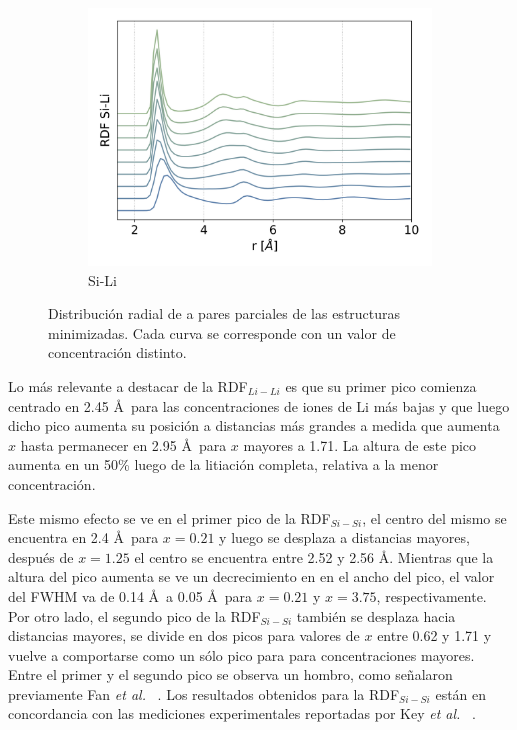 \begin{figure}[h!]
\begin{subfigure}{.475\textwidth}
        \centering
        \includegraphics[width=\textwidth]{Silicio/caracterizacion/resultados/rdf/rdf-SiLi.png}
        \caption{Si-Li}
        \label{fig:rdf-SiLi}
    \end{subfigure}
    \caption{Distribución radial de a pares parciales de las estructuras 
    minimizadas. Cada curva se corresponde con un valor de concentración
    distinto.}
    \label{fig:rdf}
\end{figure}

Lo más relevante a destacar de la RDF$_{Li-Li}$ es que su primer pico comienza 
centrado en 2.45 \AA\ para las concentraciones de iones de Li más bajas y que 
luego dicho pico aumenta su posición a distancias más grandes a medida que aumenta
$x$ hasta permanecer en 2.95 \AA\ para $x$ mayores a 1.71. La altura de este pico
aumenta en un 50\% luego de la litiación completa, relativa a la menor 
concentración.

Este mismo efecto se ve en el primer pico de la RDF$_{Si-Si}$, el centro del mismo
se encuentra en 2.4 \AA\ para $x = 0.21$ y luego se desplaza a distancias
mayores, después de $x = 1.25$ el centro se encuentra entre 2.52 y 2.56 \AA.
Mientras que la altura del pico aumenta se ve un decrecimiento en en el ancho 
del pico, el valor del FWHM va de 0.14 \AA\ a 0.05 \AA\ para $x = 0.21$ y 
$x = 3.75$, respectivamente. Por otro lado, el segundo pico de la RDF$_{Si-Si}$
también se desplaza hacia distancias mayores, se divide en dos picos para valores 
de $x$ entre 0.62 y 1.71 y vuelve a comportarse como un sólo pico para para 
concentraciones mayores. Entre el primer y el segundo pico se observa un hombro,
como señalaron previamente Fan \textit{et al.} ~\cite{fan2013}. Los resultados 
obtenidos para la RDF$_{Si-Si}$ están en concordancia con las mediciones 
experimentales reportadas por Key \textit{et al.} ~\cite{key2011}.

